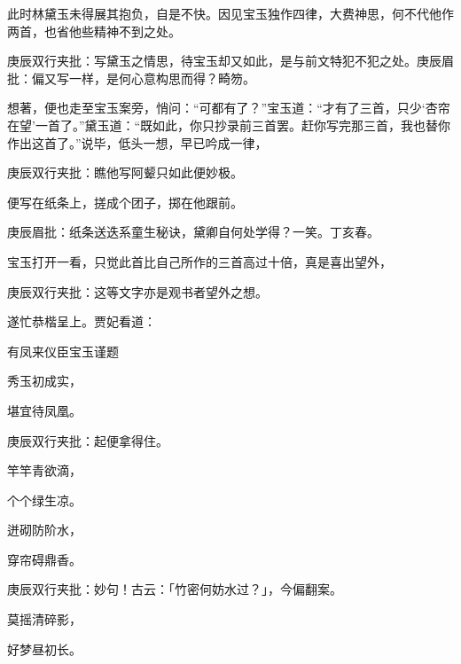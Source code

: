 \begin{parag}
    此时林黛玉未得展其抱负，自是不快。因见宝玉独作四律，大费神思，何不代他作两首，也省他些精神不到之处。\begin{note}庚辰双行夹批：写黛玉之情思，待宝玉却又如此，是与前文特犯不犯之处。庚辰眉批：偏又写一样，是何心意构思而得？畸笏。\end{note}想著，便也走至宝玉案旁，悄问：“可都有了？”宝玉道：“才有了三首，只少‘杏帘在望’一首了。”黛玉道：“既如此，你只抄录前三首罢。赶你写完那三首，我也替你作出这首了。”说毕，低头一想，早已吟成一律，\begin{note}庚辰双行夹批：瞧他写阿颦只如此便妙极。\end{note}便写在纸条上，搓成个团子，掷在他跟前。\begin{note}庚辰眉批：纸条送迭系童生秘诀，黛卿自何处学得？一笑。丁亥春。\end{note}宝玉打开一看，只觉此首比自己所作的三首高过十倍，真是喜出望外，\begin{note}庚辰双行夹批：这等文字亦是观书者望外之想。\end{note}遂忙恭楷呈上。贾妃看道：
\end{parag}
\begin{poem}

    \begin{pl}有凤来仪臣宝玉谨题\end{pl}

    \begin{pl}秀玉初成实，\end{pl}

    \begin{pl}堪宜待凤凰。\end{pl}\begin{note}庚辰双行夹批：起便拿得住。\end{note}

    \begin{pl}竿竿青欲滴，\end{pl}

    \begin{pl}个个绿生凉。\end{pl}

    \begin{pl}迸砌防阶水，\end{pl}

    \begin{pl}穿帘碍鼎香。\end{pl}\begin{note}庚辰双行夹批：妙句！古云：「竹密何妨水过？」，今偏翻案。\end{note}

    \begin{pl}莫摇清碎影，\end{pl}

    \begin{pl}好梦昼初长。\end{pl}

\end{poem}

